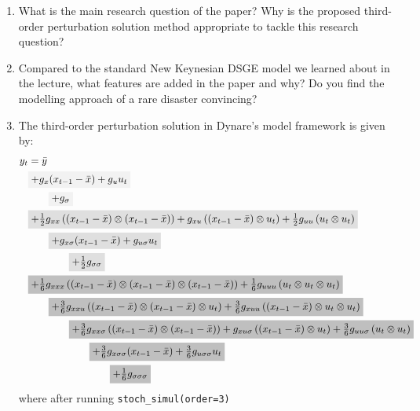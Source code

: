 \documentclass{article}
\numberwithin{equation}{section}
\begin{document}
\begin{enumerate}
\item
What is the main research question of the paper?
Why is the proposed third-order perturbation solution method appropriate to tackle this research question?

\item
Compared to the standard New Keynesian DSGE model we learned about in the lecture,
  what features are added in the paper and why? Do you find the modelling approach of a rare disaster convincing?

\item
The third-order perturbation solution in Dynare's model framework is given by:
\begin{align*}
y_t &= \bar{y}\\
&
\colorbox{gray!10}{\(%
+g_x (x_{t-1} - \bar{x}) + g_u u_{t}
\)}
\\
&
\qquad
\colorbox{gray!10}{\(%
+ g_{\sigma}
\)}
\\
&
\colorbox{gray!25}{\(%
+ \frac{1}{2} g_{xx} \left((x_{t-1} - \bar{x}) \otimes (x_{t-1} - \bar{x})\right)
  +           g_{xu} \left((x_{t-1} - \bar{x}) \otimes u_t\right)
+ \frac{1}{2} g_{uu} \left(u_t \otimes u_t\right)
\)}
\\
&
\qquad
\colorbox{gray!25}{\(%
+ g_{x\sigma} (x_{t-1} - \bar{x})
+ g_{u\sigma} u_t
\)}
\\
&
\qquad\qquad
\colorbox{gray!25}{\(%
+ \frac{1}{2} g_{\sigma\sigma}
\)}
\\
&
\colorbox{gray!50}{\(%
  + \frac{1}{6} g_{xxx} \left((x_{t-1} - \bar{x}) \otimes (x_{t-1} - \bar{x}) \otimes (x_{t-1} - \bar{x})\right)
  + \frac{1}{6} g_{uuu} \left(u_t \otimes u_t \otimes u_t\right)
\)}
\\
&
\qquad
\colorbox{gray!50}{\(%
+ \frac{3}{6} g_{xxu} \left((x_{t-1} - \bar{x}) \otimes (x_{t-1} - \bar{x}) \otimes u_t \right)
+ \frac{3}{6} g_{xuu} \left((x_{t-1} - \bar{x}) \otimes u_t \otimes u_t \right)
\)}
\\
&
\qquad\qquad
\colorbox{gray!50}{\(%
  + \frac{3}{6} g_{xx\sigma} \left((x_{t-1} - \bar{x}) \otimes (x_{t-1} - \bar{x}) \right)
  +             g_{xu\sigma} \left((x_{t-1} - \bar{x}) \otimes u_t \right)
+ \frac{3}{6} g_{uu\sigma} \left(u_t \otimes u_t \right)
\)}
\\
&
\qquad\qquad\qquad
\colorbox{gray!50}{\(%
  + \frac{3}{6} g_{x\sigma\sigma} (x_{t-1} - \bar{x})
  + \frac{3}{6} g_{u\sigma\sigma} u_t
\)}
\\
&
\qquad\qquad\qquad\qquad
\colorbox{gray!50}{\(
  + \frac{1}{6} g_{\sigma\sigma\sigma}
\)}
\end{align*}
where after running \texttt{stoch\_simul{(order=3)}}


\end{enumerate}
\end{document}
